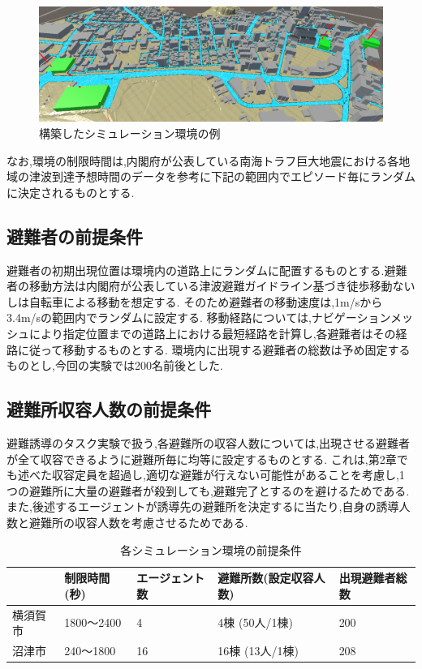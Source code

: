 \begin{figure}[H] 
  \centering 
  \includegraphics[width=1.0\textwidth]{Figures/2025-01-10 025916.png}
  \caption{構築したシミュレーション環境の例} 
  \label{fig:01} 
\end{figure}
なお,環境の制限時間は,内閣府が公表している南海トラフ巨大地震における各地域の津波到達予想時間のデータ\cite{dataNankaiTunamiTime}を参考に下記の範囲内でエピソード毎にランダムに決定されるものとする.
\subsection{避難者の前提条件}
避難者の初期出現位置は環境内の道路上にランダムに配置するものとする.避難者の移動方法は内閣府が公表している津波避難ガイドライン基づき徒歩移動ないしは自転車による移動を想定する.
そのため避難者の移動速度は,1m/sから3.4m/sの範囲内でランダムに設定する.
移動経路については,ナビゲーションメッシュにより指定位置までの道路上における最短経路を計算し,各避難者はその経路に従って移動するものとする.
環境内に出現する避難者の総数は予め固定するものとし,今回の実験では200名前後とした.
\subsection{避難所収容人数の前提条件}
避難誘導のタスク実験で扱う,各避難所の収容人数については,出現させる避難者が全て収容できるように避難所毎に均等に設定するものとする.
これは,第2章でも述べた収容定員を超過し,適切な避難が行えない可能性があることを考慮し,1つの避難所に大量の避難者が殺到しても,避難完了とするのを避けるためである.
また,後述するエージェントが誘導先の避難所を決定するに当たり,自身の誘導人数と避難所の収容人数を考慮させるためである.
\begin{table}[H]
  \begin{tabular}{|l|l|l|l|l|}
  \hline
       & 制限時間(秒)   & エージェント数 & 避難所数(設定収容人数) & 出現避難者総数 \\ \hline
  横須賀市 & 1800～2400 & 4       & 4棟 (50人/1棟)    & 200     \\ \hline
  沼津市  & 240～1800  & 16      & 16棟 (13人/1棟)   & 208     \\ \hline
  \end{tabular}
  \caption{各シミュレーション環境の前提条件}
\end{table}

